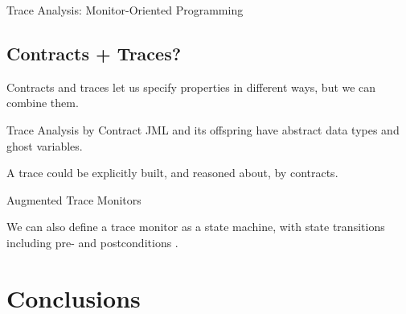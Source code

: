 \documentclass[12pt]{beamer}
\begin{document}
\begin{frame}{Trace Analysis: Monitor-Oriented Programming}

\end{frame}


\subsection{Contracts + Traces?}
\label{sec:runver-tbc}

\begin{frame}
  \begin{center}
    \Large Contracts and traces let us specify properties in different
    ways, but we can combine them.
  \end{center}
\end{frame}

\begin{frame}{Trace Analysis by Contract}
  JML and its offspring have abstract data types and ghost variables.

  \vspace{0.25cm}

  A trace could be explicitly built, and reasoned about, by contracts.
\end{frame}

\begin{frame}{Augmented Trace Monitors}

  We can also define a trace monitor as a state machine, with state
  transitions including pre- and postconditions \parencite{unified}.

  \begin{center}
  \end{center}
\end{frame}


\section{Conclusions}
\label{sec:conc}
\end{document}
